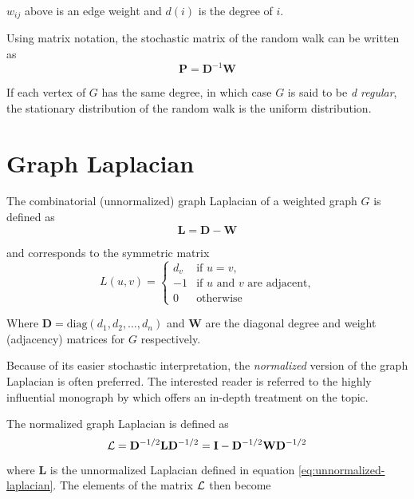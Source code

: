 $w_{ij}$ above is an edge weight and $d(i)$ is the degree of $i$.

Using matrix notation, the stochastic matrix of the random walk can be written as
\begin{equation}
\mathbf{P} = \mathbf{D}^{-1}\mathbf{W}
\label{eq:random-walk}
\end{equation}

If each vertex of $G$ has the same degree, in which case $G$ is said to be \textit{d
regular}, the stationary distribution of the random walk is the uniform distribution. 

\section{Graph Laplacian}
\label{sec:laplacian}

The combinatorial (unnormalized) graph Laplacian of a weighted graph $G$ is defined
as
\begin{equation}
\mathbf{L} = \mathbf{D} - \mathbf{W}
\label{eq:unnormalized-laplacian}
\end{equation}

and corresponds to the symmetric matrix
\begin{equation}
L(u,v) = 
\begin{cases}
d_v & \mbox{if $u = v$,} \\
-1 & \text{if $u$ and $v$ are adjacent,} \\
0 & \text{otherwise}
\end{cases}
\end{equation}

Where $\mathbf{D} = \text{diag}(d_1, d_2, \dots, d_n)$ and $\mathbf{W}$ are the
diagonal degree and weight (adjacency) matrices for $G$ respectively.

Because of its easier stochastic interpretation, the \textit{normalized} version of the graph Laplacian is often preferred. The interested reader is referred to the highly influential monograph by \cite{Chung1997} which offers an in-depth treatment on the topic.

The normalized graph Laplacian is defined as
\begin{equation}
\mathbf{\mathcal{L}} = \mathbf{D}^{-1/2} \mathbf{L} \mathbf{D}^{-1/2} = \mathbf{I} -
\mathbf{D}^{-1/2} \mathbf{W} \mathbf{D}^{-1/2}
\label{eq:normalized-laplacian}
\end{equation}	

where $\mathbf{L}$ is the unnormalized Laplacian defined in equation
\ref{eq:unnormalized-laplacian}.  The elements of the matrix $\mathbf{\mathcal{L}}$ then become

